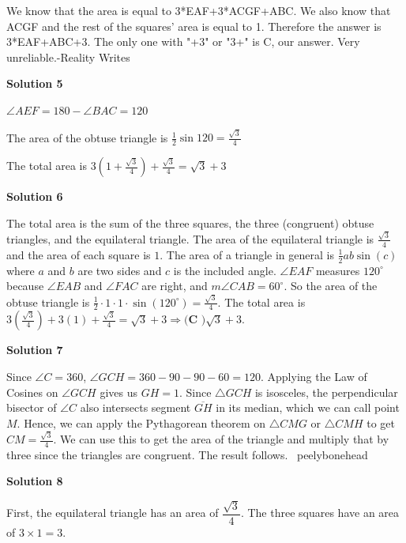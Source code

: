 \begin{enumerate}
We know that the area is equal to 3*EAF+3*ACGF+ABC. We also know that ACGF and the rest of the squares' area is equal to 1. Therefore the answer is 3*EAF+ABC+3. The only one with "+3" or "3+" is C, our answer. Very unreliable.-Reality Writes

 



\textbf{Solution 5}

$\angle{AEF} = 180- \angle{BAC} = 120$

 The area of the obtuse triangle is $\frac{1}{2}\sin{120} = \frac{\sqrt{3}}{4}$

 The total area is $3\left(1 + \frac{\sqrt{3}}{4}\right) + \frac{\sqrt{3}}{4} = \sqrt{3} + 3$




\textbf{Solution 6}

The total area is the sum of the three squares, the three (congruent) obtuse triangles, and the equilateral triangle. The area of the equilateral triangle is $\frac{\sqrt{3}}{4}$ and the area of each square is $1$. The area of a triangle in general is $\frac{1}{2}ab\sin(c)$ where $a$ and $b$ are two sides and $c$ is the included angle. $\angle EAF$ measures $120^{\circ}$ because $\angle EAB$ and $\angle FAC$ are right, and $m\angle CAB=60^{\circ}$. So the area of the obtuse triangle is $\frac{1}{2}\cdot1\cdot1\cdot\sin\left(120^{\circ}\right)=\frac{\sqrt{3}}{4}$. The total area is $3\left(\frac{\sqrt{3}}{4}\right)+3\left(1\right)+\frac{\sqrt{3}}{4}=\sqrt{3}+3 \Longrightarrow \boxed{\textbf{(C )}\sqrt{3}+3}$.

 


 



\textbf{Solution 7}

Since $\angle C=360$, $\angle GCH=360-90-90-60=120.$ Applying the Law of Cosines on $\angle GCH$ gives us $GH = 1.$ Since $\triangle GCH$ is isosceles, the perpendicular bisector of $\angle C$ also intersects segment $\overline{GH}$ in its median, which we can call point $M.$ Hence, we can apply the Pythagorean theorem on $\triangle CMG$ or $\triangle CMH$ to get $CM = \frac{\sqrt{3}}{4}.$ We can use this to get the area of the triangle and multiply that by three since the triangles are congruent. The result follows. ~peelybonehead

 



\textbf{Solution 8}

First, the equilateral triangle has an area of $\dfrac{\sqrt{3}}{4}$. The three squares have an area of $3\times 1=3$. 


\end{enumerate}
